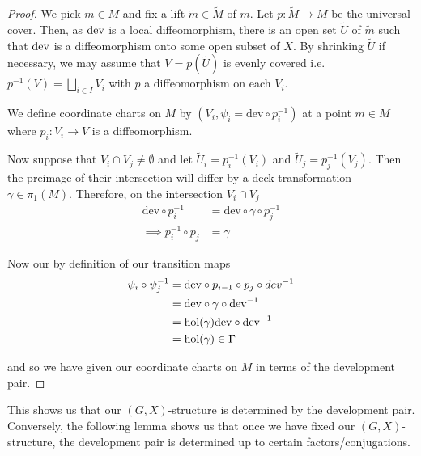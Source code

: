 \begin{proof}

    We pick $m\in M$ and fix a lift $\tilde{m}\in \tilde{M}$ of $m$. Let $p:
        \tilde{M} \to M$ be the universal cover. Then, as $\text{dev}$ is a local
    diffeomorphism, there is an open set $\tilde{U}$ of $\tilde{m}$ such that
    $\text{dev}$ is a diffeomorphism onto some open subset of $X$. By shrinking
    $\tilde{U}$ if necessary, we may assume that $V =p(\tilde{U})$ is evenly
    covered i.e. $p^{-1}(V) = \bigsqcup_{i \in I}V_{i}$ with $p$ a diffeomorphism
    on each $V_{i}$.

    We define coordinate charts on $M$ by $(V_{i}, \psi_{i} = \text{dev}\circ
        p^{-1}_{i})$ at a point $m \in M$ where $p_{i}: V_{i} \to V$ is a
    diffeomorphism.

    Now suppose that $V_i \cap V_j \neq \emptyset$ and let $\tilde{U}_i =
        p_i^{-1}(V_i)$ and $\tilde{U}_j = p_j^{-1}(V_j)$. Then the preimage of their
    intersection will differ by a deck transformation $\gamma \in \pi_1(M)$.
    Therefore, on the intersection $V_i \cap V_j$
    \begin{align*}
        \text{dev}\circ p_i^{-1}    & = \text{dev}\circ \gamma \circ p_j^{-1} \\
        \implies p^{-1}_i \circ p_j & = \gamma
    \end{align*}

    Now our by definition of our transition maps
    \begin{align*}
        \psi_i \circ \psi_j^{-1} & = \text{dev}\circ p_{i-1} \circ p_j \circ dev^{-1} \\
                                 & = \text{dev}\circ \gamma \circ \text{dev}^{-1}           \\
                                 & = \text{hol}(\gamma)\text{dev}\circ \text{dev}^{-1}            \\
                                 & = \text{hol}(\gamma) \in \Gamma
    \end{align*}

    and so we have given our coordinate charts on $M$ in terms of the development
    pair.
\end{proof}

This shows us that our $(G,X)$-structure is determined by the development pair.
Conversely, the following lemma shows us that once we have fixed our
$(G,X)$-structure, the development pair is determined up to certain
factors/conjugations.

